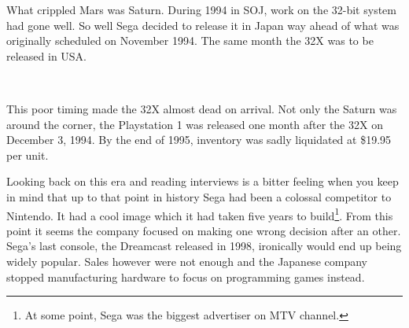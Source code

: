 What crippled Mars was Saturn. During 1994 in SOJ, work on the 32-bit system had gone well. So well Sega decided to release it in Japan way ahead of what was originally scheduled on November 1994. The same month the 32X was to be released in USA.\\

\par

\\
 \par This poor timing made the 32X almost dead on arrival. Not only the Saturn was around the corner, the  Playstation 1 was released one month after the 32X on December 3, 1994. By the end of 1995, inventory was sadly liquidated at \$19.95 per unit.\\
\par
Looking back on this era and reading interviews is a bitter feeling when you keep in mind that up to that point in history Sega had been a colossal competitor to Nintendo. It had a cool image which it had taken five years to build\footnote{At some point, Sega was the biggest advertiser on MTV channel.}. From this point it seems the company focused on making one wrong decision after an other. Sega's last console, the Dreamcast released in 1998, ironically would end up being widely popular. Sales however were not enough and the Japanese company stopped manufacturing hardware to focus on programming games instead.\\ 





